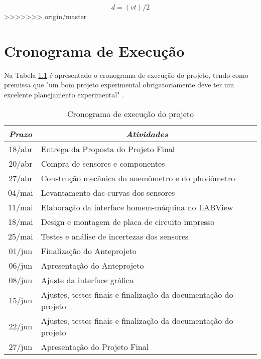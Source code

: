 \documentclass[12pt,a4paper]{instrumentacao}
\begin{document}
\begin{equation}
	d=(vt)/2
	\label{eq:dist_ultrassom}
\end{equation}
>>>>>>> origin/master



\chapter{Cronograma de Execução}

Na Tabela \ref{tab:cronograma} é apresentado o cronograma de execução do projeto, tendo como premissa que "um bom projeto experimental obrigatoriamente deve ter um excelente planejamento experimental" \cite{livro-texto}.

\begin{table}[H]
\centering
\caption{Cronograma de execução do projeto}
\label{tab:cronograma}
\begin{tabular}{|c|l|}
\hline
\textit{\textbf{Prazo}} & \multicolumn{1}{c|}{\textit{\textbf{Atividades}}}               \\ \hline
18/abr                  & Entrega da Proposta do Projeto Final                            \\ \hline
20/abr                  & Compra de sensores e componentes                                \\ \hline
27/abr                  & Construção mecânica do anemômetro e do pluviômetro              \\ \hline
04/mai                  & Levantamento das curvas dos sensores                            \\ \hline
11/mai                  & Elaboração da interface homem-máquina no LABView                \\ \hline
18/mai                  & Design e montagem de placa de circuito impresso                 \\ \hline
25/mai                  & Testes e análise de incertezas dos sensores                     \\ \hline
01/jun                  & Finalização do Anteprojeto                                      \\ \hline
06/jun                  & Apresentação do Anteprojeto                                     \\ \hline
08/jun                  & Ajuste da interface gráfica                                     \\ \hline
15/jun                  & Ajustes, testes finais e finalização da documentação do projeto \\ \hline
22/jun                  & Ajustes, testes finais e finalização da documentação do projeto \\ \hline
27/jun                  & Apresentação do Projeto Final                                   \\ \hline
\end{tabular}
\end{table}
\end{document}
